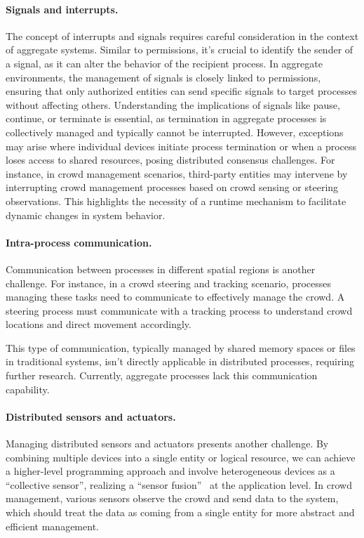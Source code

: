 \documentclass[12pt, a4paper]{article}
\begin{document}
\paragraph{Signals and interrupts.}
\label{par:signals-and-interrupts}
The concept of interrupts and signals requires careful consideration in the context of aggregate systems.
%
Similar to permissions,
it's crucial to identify the sender of a signal,
as it can alter the behavior of the recipient process.
%
In aggregate environments,
the management of signals is closely linked to permissions,
ensuring that only authorized entities can send specific signals to target processes without affecting others.
%
Understanding the implications of signals like pause, continue, or terminate is essential,
as termination in aggregate processes is collectively managed and typically cannot be interrupted.
%
However,
exceptions may arise where individual devices initiate process termination or when a process loses access to shared resources,
posing distributed consensus challenges.
%
For instance, in crowd management scenarios,
third-party entities may intervene by interrupting crowd management processes based on crowd sensing or steering observations.
%
This highlights the necessity of a runtime mechanism to facilitate dynamic changes in system behavior.

\paragraph{Intra-process communication.}
\label{par:intra-process-communication}
Communication between processes in different spatial regions is another challenge.
%
For instance,
in a crowd steering and tracking scenario,
processes managing these tasks need to communicate to effectively manage the crowd.
%
A steering process must communicate with a tracking process to understand crowd locations and direct movement accordingly.

This type of communication,
typically managed by shared memory spaces or files in traditional systems,
isn't directly applicable in distributed processes,
requiring further research.
%
Currently, aggregate processes lack this communication capability.

\paragraph{Distributed sensors and actuators.}
\label{par:distributed-sensors-and-actuators}
Managing distributed sensors and actuators presents another challenge.
%
By combining multiple devices into a single entity or logical resource,
we can achieve a higher-level programming approach and involve heterogeneous devices as a ``collective sensor'',
realizing a ``sensor fusion''~\cite{sasiadek2002sensor} at the application level.
%
In crowd management,
various sensors observe the crowd and send data to the system,
which should treat the data as coming from a single entity for more abstract and efficient management.
\\
\end{document}
